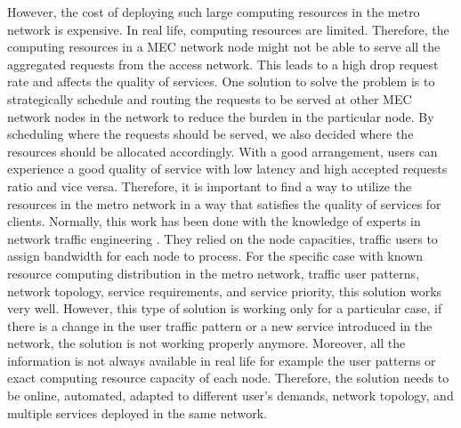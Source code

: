 \documentclass[conference]{IEEEtran}
\begin{document}
However, the cost of deploying such large computing resources in the metro network is expensive. In real life, computing resources are limited. Therefore, the computing resources in a MEC network node might not be able to serve all the aggregated requests from the access network. This leads to a high drop request rate and affects the quality of services. One solution to solve the problem is to strategically schedule and routing the requests to be served at other MEC network nodes in the network to reduce the burden in the particular node. By scheduling where the requests should be served, we also decided where the resources should be allocated accordingly. With a good arrangement, users can experience a good quality of service with low latency and high accepted requests ratio and vice versa. Therefore, it is important to find a way to utilize the resources in the metro network in a way that satisfies the quality of services for clients. Normally, this work has been done with the knowledge of experts in network traffic engineering \cite{7534741}. They relied on the node capacities, traffic users to assign bandwidth for each node to process. For the specific case with known resource computing distribution in the metro network, traffic user patterns, network topology, service requirements, and service priority, this solution works very well. However, this type of solution is working only for a particular case, if there is a change in the user traffic pattern or a new service introduced in the network, the solution is not working properly anymore. Moreover, all the information is not always available in real life for example the user patterns or exact computing resource capacity of each node. Therefore, the solution needs to be online, automated, adapted to different user's demands, network topology, and multiple services deployed in the same network. 
\end{document}
